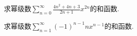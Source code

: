\begin{example}
求幂级数\(\sum_{n=0}^\infty \frac{4n^2+4n+3}{2n+1} x^{2n}\)的和函数.
\end{example}
\begin{example}
求幂级数\(\sum_{n=1}^\infty (-1)^{n-1} n x^{n-1}\)的和函数.
\end{example}

